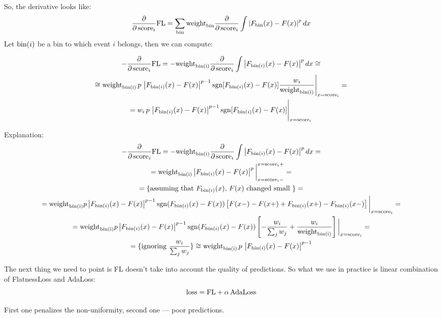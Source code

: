 So, the derivative looks like:
\[
	\dfrac{\partial} {\partial \, \text{score}_i} \text{FL}
	= \sum_{\text{bin}} \text{weight}_\text{bin} \frac{\partial }{ \partial \, \text{score}_i} 
			\int \left\vert F_{\text{bin}}(x) - F(x)\right\vert^p dx
\]
Let $\text{bin}(i)$ be a bin to which event $i$ belongs, then we can compute:
\def\binIweight{\text{weight}_\text{\bin(i)}}


\begin{multline*}
	- \dfrac{\partial} {\partial \, \score_i} \FL = 
		- \binIweight
		\frac{\partial }{ \partial \, \score_i} 
			\int \abs{F_{\bin(i)}(x) - F(x)}^p dx \cong \\
	\cong \binIweight \, p \,  \abs{F_{\bin(i)}(x) - F(x)}^{p-1} 
		\sgn[F_{\bin(i)}(x) - F(x)]
		\dfrac{w_i}{\binIweight}
		\Bigg|_{x=\score_i} = \\
	= 
		w_i \, p \,  \abs{F_{\bin(i)}(x) - F(x)}^{p-1}
		\sgn[F_{\bin(i)}(x) - F(x)]
		\Bigg|_{x=\score_i}
\end{multline*}

Explanation:
\begin{multline*}
	- \dfrac{\partial} {\partial \, \score_i} \FL = 
		- \binIweight \frac{\partial }{ \partial \, \score_i} \int \abs{F_{\bin(i)}(x) - F(x)}^p dx = \\
	= \binIweight \abs{F_{\bin(i)}(x) - F(x)}^p \bigg|_{x=\score_i-}^{x=\score_i+} = \\
	= \{ \text{assuming that $F_{\bin(i)}(x)$, $F(x)$ changed small } \} = \\
	= \binIweight p \abs{F_{\bin(i)}(x) - F(x)}^{p-1} \sgn(F_{\bin(i)}(x) - F(x)) \left[F(x-) - F(x+) + F_{\bin(i)}(x+) - F_{\bin(i)}(x-)\right] \bigg|_{x=\score_i}= \\
	= \binIweight p \abs{F_{\bin(i)}(x) - F(x)}^{p-1} \sgn(F_{\bin(i)}(x) - F(x)) \left[- \frac{w_i}{\sum_j w_j} + \frac{w_i}{\binIweight} \right] \bigg|_{x=\score_i}= \\
	= \{ \text{ignoring $\frac{w_i}{\sum_j w_j}$}  \}
	\cong \binIweight \, p \,  \abs{F_{\bin(i)}(x) - F(x)}^{p-1} 
\end{multline*}


The next thing we need to point is FL doesn't take into account the quality of predictions. So what we use in practice is linear combination of FlatnessLoss and AdaLoss:
\[
	\text{loss} = \text{FL} + \alpha \, \text{AdaLoss}
\]

First one penalizes the non-uniformity, second one --- poor predictions.

